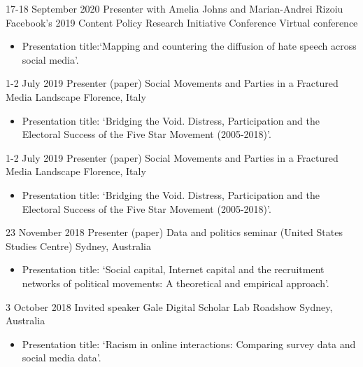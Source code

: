 \documentclass[11pt,a4paper,sans]{moderncv}
\begin{document}
\cventry
{17-18 September 2020}
{Presenter with Amelia Johns and Marian-Andrei Rizoiu}
{Facebook's 2019 Content Policy Research Initiative Conference}
{Virtual conference}
{}
       {
      \begin{itemize} %
        \item {Presentation title:`Mapping and countering the diffusion of hate speech across social media'.}
      \end{itemize}
    }


\cventry
    {1-2 July 2019} %
    {Presenter (paper)} %
    {Social Movements and Parties in a Fractured Media Landscape} %
    {Florence, Italy} %
        {}
        {
      \begin{itemize} %
        \item {Presentation title: `Bridging the Void. Distress, Participation and the
Electoral Success of the Five Star Movement (2005-2018)'.}
      \end{itemize}
    }


    \cventry
        {1-2 July 2019} 
    {Presenter (paper)} %
    {Social Movements and Parties in a Fractured Media Landscape} %
    {Florence, Italy} %
        {}
    {
      \begin{itemize} %
        \item {Presentation title: `Bridging the Void. Distress, Participation and the
Electoral Success of the Five Star Movement (2005-2018)'.}
      \end{itemize}
    }
 
    \cventry
       {23 November 2018} %
    {Presenter (paper)} %
    {Data and politics seminar (United States Studies Centre)} %
    {Sydney, Australia} %
 {}
    {
      \begin{itemize} %
        \item {Presentation title: `Social capital, Internet capital and the recruitment networks of political movements: A theoretical and empirical approach'.}
      \end{itemize}
    }

  
    \cventry
      {3 October 2018} %
    {Invited speaker} %
    {Gale Digital Scholar Lab Roadshow} %
    {Sydney, Australia} %
  {}
    {
      \begin{itemize} %
        \item {Presentation title: `Racism in online interactions: Comparing survey data and social media data'.}
      \end{itemize}
    }
\end{document}
